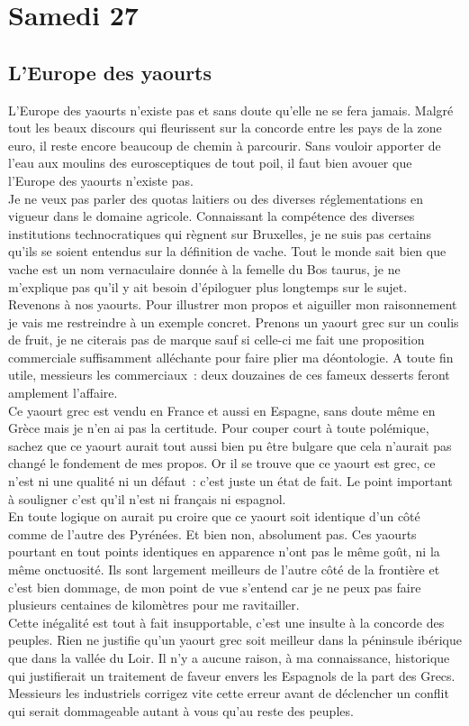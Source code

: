 ﻿\section*{Samedi 27}
\subsection{L’Europe des yaourts}
L’Europe des yaourts n’existe pas et sans doute qu’elle ne se fera jamais. Malgré tout les beaux discours qui fleurissent sur la concorde entre les pays de la zone euro, il reste encore beaucoup de chemin à parcourir. Sans vouloir apporter de l’eau aux moulins des eurosceptiques de tout poil, il faut bien avouer que l’Europe des yaourts n’existe pas. \\
Je ne veux pas parler des quotas laitiers ou des diverses réglementations en vigueur dans le domaine agricole. Connaissant la compétence des diverses institutions technocratiques qui règnent sur Bruxelles, je ne suis pas certains qu’ils se soient entendus sur la définition de vache. Tout le monde sait bien que vache est un nom vernaculaire donnée à la femelle du Bos taurus, je ne m’explique pas qu’il y ait besoin d’épiloguer plus longtemps sur le sujet. \\

Revenons à nos yaourts. Pour illustrer mon propos et aiguiller mon raisonnement je vais me restreindre à un exemple concret. Prenons un yaourt grec sur un coulis de fruit, je ne citerais pas de marque sauf si celle-ci me fait une proposition commerciale suffisamment alléchante pour faire plier ma déontologie. A toute fin utile, messieurs les commerciaux : deux douzaines de ces fameux desserts feront amplement l’affaire. \\
Ce yaourt grec est vendu en France et aussi en Espagne, sans doute même en Grèce mais je n’en ai pas la certitude. Pour couper court à toute polémique, sachez que ce yaourt aurait tout aussi bien pu être bulgare que cela n’aurait pas changé le fondement de mes propos. Or il se trouve que ce yaourt est grec, ce n’est ni une qualité ni un défaut : c’est juste un état de fait. Le point important à souligner c’est qu’il n’est ni français ni espagnol. \\

En toute logique on aurait pu croire que ce yaourt soit identique d’un côté comme de l’autre des Pyrénées. Et bien non, absolument pas. Ces yaourts pourtant en tout points identiques en apparence n’ont pas le même goût, ni la même onctuosité. Ils sont largement meilleurs de l’autre côté de la frontière et c’est bien dommage, de mon point de vue s’entend car je ne peux pas faire plusieurs centaines de kilomètres pour me ravitailler. \\

Cette inégalité est tout à fait insupportable, c’est une insulte à la concorde des peuples. Rien ne justifie qu’un yaourt grec soit meilleur dans la péninsule ibérique que dans la vallée du Loir. Il n’y a aucune raison, à ma connaissance, historique qui justifierait un traitement de faveur envers les Espagnols de la part des Grecs. \\
Messieurs les industriels corrigez vite cette erreur avant de déclencher un conflit qui serait dommageable autant à vous qu’au reste des peuples.
